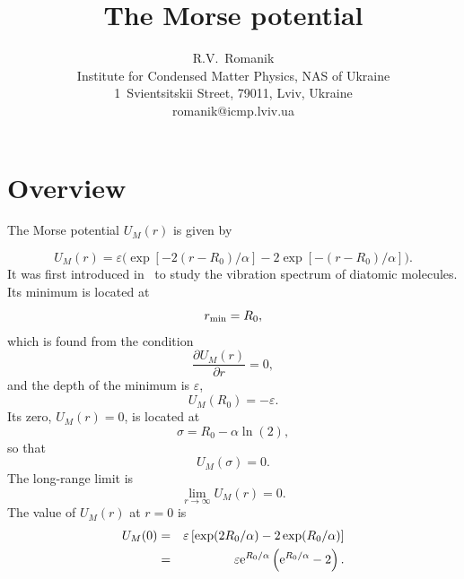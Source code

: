 \documentclass[12pt]{article}
\title{The Morse potential}
\author{R.V.~Romanik
	\\ \small Institute for Condensed Matter Physics, NAS of Ukraine 
	\\ \small 1~Svientsitskii Street, 79011, Lviv, Ukraine 
	\\ \small romanik@icmp.lviv.ua}
\begin{document}
	
	\maketitle
	
	
	
	\section{Overview}
	The Morse potential $U_{M}(r)$ is given by
	
	\begin{equation}
		\label{def:morse}
		U_{M}(r) = \varepsilon \boldsymbol{(}\exp{[-2(r-R_0)/\alpha]}-2\exp{[-(r-R_0)/\alpha]}\boldsymbol{)}.
	\end{equation}
	It was first introduced in~\cite{Morse1929} to study the vibration spectrum of diatomic molecules.
	Its minimum is located at 
	\begin{equation}
		r_{\rm min}=R_0,
	\end{equation}
	which is found from the condition
	\begin{equation}
		\frac{\partial U_{M}(r)}{\partial r} = 0,
	\end{equation}
	and the depth of the minimum is $\varepsilon$,
	\begin{equation}
		U_{M}(R_0) = -\varepsilon.
	\end{equation}
	Its zero, $U_M(r) = 0$, is located at 
	\begin{equation}
		\sigma = R_0 - \alpha \ln(2),
	\end{equation}
	so that 
	\begin{equation}
		U_M(\sigma) = 0.
	\end{equation}
	The long-range limit is
	\begin{equation}
		\lim_{r \to \infty} U_M(r) = 0.
	\end{equation}
	The value of $U_M(r)$ at $r=0$ is
	\begin{eqnarray}
		U_M(0) & = & \varepsilon \left[\exp(2R_0/\alpha)-2\exp(R_0/\alpha) \right]
		\\
		& = & \varepsilon {\rm e}^{R_0/\alpha} \left({\rm e}^{R_0/\alpha}-2 \right).
	\end{eqnarray}
\end{document}
